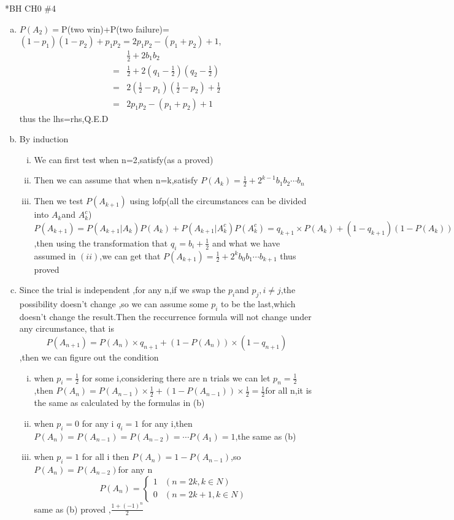 \documentclass{article}
\begin{document}
\begin{homeworkProblem}*{BH CH0 \#4}
	\begin{enumerate}[(a)]
		\item $P(A_2)=$P(two win)+P(two failure)=$(1-p_1)(1-p_2)+p_1p_2=2p_1p_2-(p_1+p_2)+1$, 
		$$\begin{aligned}			
		&\frac{1}{2}+2b_1b_2\\
		=&\frac{1}{2}+2(q_1-\frac{1}{2})(q_2-\frac{1}{2})
\\      =&2(\frac{1}{2}-p_1)(\frac{1}{2}-p_2)+\frac{1}{2}
\\      =&2p_1p_2-(p_1+p_2)+1		
		\end{aligned}$$
		thus the lhs=rhs,Q.E.D
	\item By induction
	\begin{enumerate}[(i)]
		\item We can first test when n=2,satisfy(as a proved)
		\item Then we can assume that when n=k,satisfy $P(A_k)=\frac{1}{2}+2^{k-1}b_1b_2\cdots b_n$
	\item Then we test $P(A_{k+1})$ using lofp(all the circumstances can be divided into $A_k$and $A_k^c$) $P(A_{k+1})=P(A_{k+1}|A_k)P(A_k)+P(A_{k+1}|A_k^c)P(A_k^c)=q_{k+1}\times P(A_k)+(1-q_{k+1})(1-P(A_{k}))=2q_{k+1}P(A_{k})-P(A_{k})-q_{k+1}+1$,then using the transformation that $q_i=b_i+\frac{1}{2}$ and what we have assumed in $(ii)$,we can get that $P(A_{k+1})=\frac{1}{2}+2^kb_0b_1\cdots b_{k+1}$
thus proved	\end{enumerate}
\item Since the trial is independent ,for any n,if we swap the $p_i$and $p_j,i\neq j$,the possibility doesn't change ,so we can assume some $p_i$ to be the last,which doesn't change the result.Then the reccurrence formula will not change under any circumstance,
that is  $$P(A_{n+1})=P(A_n)\times q_{n+1}+(1-P(A_n))\times (1-q_{n+1})$$,then we can figure out the condition 
\begin{enumerate}[(i)]
	\item when $p_i=\frac{1}{2}$ for some i,considering there are n trials we can let $p_{n}=\frac{1}{2}$,then $P(A_{n})=P(A_{n-1})\times\frac{1}{2}+(1-P(A_{n-1}))\times\frac{1}{2}=\frac{1}{2} $for all n,it is the same as calculated by the formulas in (b)
	\item when $p_i=0$ for any i $q_i=1$ for any i,then $P(A_n)=P(A_{n-1})=P(A_{n-2})=\cdots P(A_1)=1$,the same as (b)
	\item when $p_i=1$ for all i then $P(A_n)=1-P(A_{n-1})$,so $P(A_n)=P(A_{n-2})$for any n 
	\begin{equation}
		P(A_n)=
	\begin{cases}
		1 &(n=2k,k\in N)\\
		0 &(n=2k+1,k\in N)
	\end{cases}
\end{equation}
same as (b) proved ,$\frac{1+(-1)^n}{2}$
\end{enumerate} 	
\end{enumerate}
\end{homeworkProblem}
\end{document}
